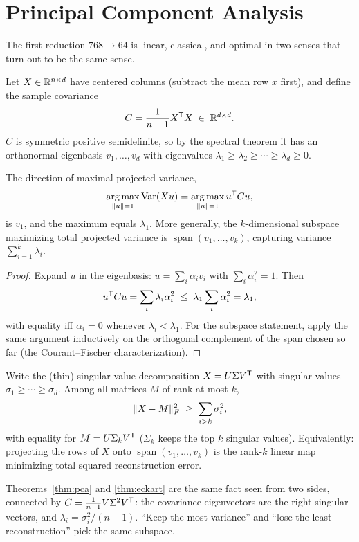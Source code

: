 \section{Principal Component Analysis}

The first reduction $768 \to 64$ is linear, classical, and optimal in two
senses that turn out to be the same sense.

Let $X \in \mathbb{R}^{n \times d}$ have centered columns (subtract the mean row
$\bar{x}$ first), and define the sample covariance
\[
C = \frac{1}{n-1} X^{\mathsf{T}} X \;\in\; \mathbb{R}^{d \times d}.
\]
$C$ is symmetric positive semidefinite, so by the spectral theorem it has an
orthonormal eigenbasis $v_1, \dots, v_d$ with eigenvalues
$\lambda_1 \ge \lambda_2 \ge \cdots \ge \lambda_d \ge 0$.

\begin{theorem}\label{thm:pca}
The direction of maximal projected variance,
\[
\operatorname*{arg\,max}_{\lVert u\rVert = 1} \operatorname{Var}(Xu) = \operatorname*{arg\,max}_{\lVert u\rVert = 1} u^{\mathsf{T}} C u,
\]
is $v_1$, and the maximum equals $\lambda_1$. More generally, the
$k$-dimensional subspace maximizing total projected variance is
$\operatorname{span}(v_1, \dots, v_k)$, capturing variance
$\sum_{i=1}^{k} \lambda_i$.
\end{theorem}

\begin{proof}
Expand $u$ in the eigenbasis: $u = \sum_i \alpha_i v_i$ with
$\sum_i \alpha_i^2 = 1$. Then
\[
u^{\mathsf{T}} C u = \sum_{i} \lambda_i \alpha_i^2
\;\le\; \lambda_1 \sum_i \alpha_i^2 = \lambda_1,
\]
with equality iff $\alpha_i = 0$ whenever $\lambda_i < \lambda_1$. For the
subspace statement, apply the same argument inductively on the orthogonal
complement of the span chosen so far (the Courant--Fischer characterization).
\end{proof}

\begin{theorem}\label{thm:eckart}
Write the (thin) singular value decomposition $X = U \Sigma V^{\mathsf{T}}$ with
singular values $\sigma_1 \ge \cdots \ge \sigma_d$. Among all matrices $M$ of
rank at most $k$,
\[
\lVert X - M\rVert_F^2 \;\ge\; \sum_{i > k} \sigma_i^2,
\]
with equality for $M = U \Sigma_k V^{\mathsf{T}}$ ($\Sigma_k$ keeps the top $k$
singular values). Equivalently: projecting the rows of $X$ onto
$\operatorname{span}(v_1,\dots,v_k)$ is the rank-$k$ linear map minimizing
total squared reconstruction error.
\end{theorem}

\begin{remark}
Theorems~\ref{thm:pca} and \ref{thm:eckart} are the same fact seen from two
sides, connected by $C = \frac{1}{n-1} V \Sigma^2 V^{\mathsf{T}}$: the covariance
eigenvectors are the right singular vectors, and
$\lambda_i = \sigma_i^2/(n-1)$. ``Keep the most variance'' and ``lose the
least reconstruction'' pick the same subspace.
\end{remark}


